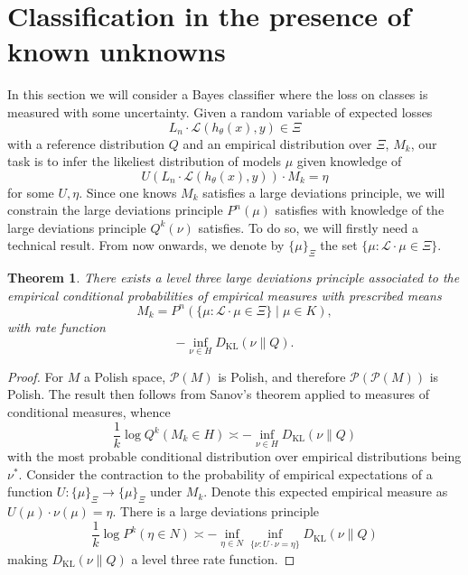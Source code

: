 \documentclass[11pt]{amsart}
\numberwithin{equation}{section}
\newtheorem{theorem}{Theorem}[section]
\theoremstyle{remark}
\theoremstyle{remark}
\newcommand{\lag}{\mathcal{L}}
\begin{document}
\section{Classification in the presence of known unknowns}\label{max-ent-uncertainty-section}

In this section we will consider a Bayes classifier where the loss on classes is measured with some uncertainty. Given a random variable of expected losses
\[
    L_n \cdot \lag(h_\theta(x), y) \in \Xi
\]
with a reference distribution $Q$ and an empirical distribution over $\Xi$, $M_k$, our task is to infer the likeliest distribution of models $\mu$ given knowledge of 
\[
    U(L_n \cdot \lag(h_\theta(x), y))\cdot M_k = \eta 
\]
for some $U, \eta$. Since one knows $M_k$ satisfies a large deviations principle, we will constrain the large deviations principle $P^n(\mu)$ satisfies with knowledge of the large deviations principle $Q^k(\nu)$ satisfies. To do so, we will firstly need a technical result. From now onwards, we denote by $\{\mu\}_\Xi$ the set $\{\mu : \lag \cdot \mu \in \Xi\}$.

\begin{theorem}\label{level-three-thm}
    There exists a level three large deviations principle associated to the empirical conditional probabilities of empirical measures with prescribed means 
    \[
        M_k = P^n(\{\mu : \lag\cdot\mu \in \Xi\} \mid \mu \in K),
    \]
    with rate function 
    \[
        -\inf_{\nu \in H} D_{\mathrm{KL}}(\nu \| Q).
    \]
\end{theorem}
\begin{proof}
    For $M$ a Polish space, $\mathcal{P}(M)$ is Polish, and therefore $\mathcal{P}(\mathcal{P}(M))$ is Polish. The result then follows from Sanov's theorem applied to measures of conditional measures, whence 
    \[
        \frac{1}{k} \log Q^k(M_k \in H) \asymp - \inf_{\nu \in H} D_{\mathrm{KL}}(\nu \| Q)
    \]
    with the most probable conditional distribution over empirical distributions being $\nu^*$. Consider the contraction to the probability of empirical expectations of a function $U\colon \{\mu\}_\Xi \to \{\mu\}_\Xi$ under $M_k$. Denote this expected empirical measure as $U(\mu)\cdot\nu(\mu) = \eta$. There is a large deviations principle
    \[
        \frac{1}{k} \log P^k(\eta \in N) \asymp - \inf_{\eta \in N} \inf_{\{\nu : U \cdot\nu = \eta\}} D_{\mathrm{KL}}(\nu \| Q)
    \]
    making $D_{\mathrm{KL}}(\nu \| Q)$ a level three rate function. 
\end{proof}
\end{document}
